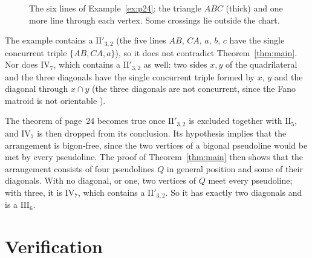 \documentclass[11pt,a4paper]{amsart}
\theoremstyle{definition}
\theoremstyle{remark}
\newcommand{\II}[1]{\mathrm{II}_{#1}}
\newcommand{\IIp}{\mathrm{II}'_{3,2}}
\newcommand{\III}{\mathrm{III}_{6}}
\begin{document}
\begin{figure}[ht]
\centering
{}
\caption{The six lines of Example~\ref{ex:p24}: the triangle $ABC$ (thick) and one more line through each vertex. Some crossings lie outside the chart.}\label{fig:cex}
\end{figure}


The example contains a $\IIp$ (the five lines $AB$, $CA$, $a$, $b$, $c$ have the single concurrent triple $\{AB, CA, a\}$), so it does not contradict Theorem~\ref{thm:main}. Nor does $\mathrm{IV}_7$, which contains a $\IIp$ as well: two sides $x, y$ of the quadrilateral and the three diagonals have the single concurrent triple formed by $x$, $y$ and the diagonal through $x \cap y$ (the three diagonals are not concurrent, since the Fano matroid is not orientable \cite{bjorner1999}).

The theorem of page~24 becomes true once $\IIp$ is excluded together with $\II5$, and $\mathrm{IV}_7$ is then dropped from its conclusion. Its hypothesis implies that the arrangement is bigon-free, since the two vertices of a bigonal pseudoline would be met by every pseudoline. The proof of Theorem~\ref{thm:main} then shows that the arrangement consists of four pseudolines $Q$ in general position and some of their diagonals. With no diagonal, or one, two vertices of $Q$ meet every pseudoline; with three, it is $\mathrm{IV}_7$, which contains a $\IIp$. So it has exactly two diagonals and is a $\III$.

\section{Verification}\label{sec:verif}
\end{document}
